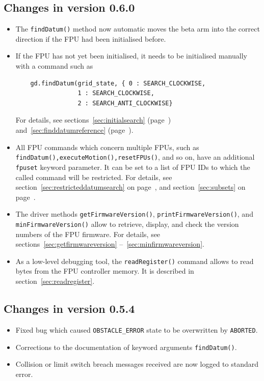 \documentclass[11pt,a4paper]{scrartcl}
\begin{document}
\subsection*{Changes in version 0.6.0}
\begin{itemize}
\item The \texttt{findDatum()} method now automatic moves the beta
  arm into the correct direction if the FPU had been initialised before.

\item If the FPU has not yet been initialised, it needs to be
  initialised manually with a command such as
  \begin{verbatim}
    gd.findDatum(grid_state, { 0 : SEARCH_CLOCKWISE,
                 1 : SEARCH_CLOCKWISE,
                 2 : SEARCH_ANTI_CLOCKWISE}
  \end{verbatim}

  For details, see sections~\ref{sec:initialsearch}
  (page~\pageref{sec:initialsearch}) and~\ref{sec:finddatumreference}
  (page~\pageref{sec:finddatumreference}).
  
\item All FPU commands which concern multiple FPUs, such as
  \texttt{findDatum(),executeMotion(),resetFPUs()}, and so on, have an
  additional \texttt{fpuset} keyword parameter. It can be set to a
  list of FPU IDs to which the called command will be restricted. For
  details, see section~\ref{sec:restricteddatumsearch} on
  page~\pageref{sec:restricteddatumsearch}, and
  section~\ref{sec:subsets} on page~\pageref{sec:subsets}.
  
\item The driver methods \texttt{getFirmwareVersion()},
  \texttt{printFirmwareVersion()}, and \texttt{minFirmwareVersion()}
  allow to retrieve, display, and check the version numbers of the FPU
  firmware. For details, see sections~\ref{sec:getfirmwareversion}
    --~\ref{sec:minfirmwareversion}.

\item As a low-level debugging tool, the \texttt{readRegister()}
  command allows to read bytes from the FPU controller memory.  It is
  described in section~\ref{sec:readregister}.
  
\end{itemize}



\subsection*{Changes in version 0.5.4}
\begin{itemize}
\item Fixed bug which caused \texttt{OBSTACLE\_ERROR} state to be overwritten by \texttt{ABORTED}.
\item Corrections to the documentation of keyword arguments \texttt{findDatum()}.
\item Collision or limit switch breach messages received are now logged to standard error.
\end{itemize}
\end{document}
